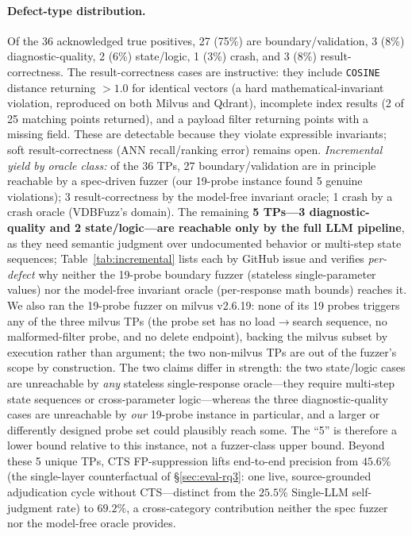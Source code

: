 \documentclass[sigconf]{acmart}
\begin{document}
\paragraph{Defect-type distribution.} Of the 36 acknowledged true positives, 27 (75\%) are boundary/validation, 3 (8\%) diagnostic-quality, 2 (6\%) state/logic, 1 (3\%) crash, and 3 (8\%) result-correctness. The result-correctness cases are instructive: they include \texttt{COSINE} distance returning $>1.0$ for identical vectors (a hard mathematical-invariant violation, reproduced on both Milvus and Qdrant), incomplete index results (2 of 25 matching points returned), and a payload filter returning points with a missing field. These are detectable because they violate expressible invariants; soft result-correctness (ANN recall/ranking error) remains open. \emph{Incremental yield by oracle class:} of the 36 TPs, 27 boundary/validation are in principle reachable by a spec-driven fuzzer (our 19-probe instance found 5 genuine violations); 3 result-correctness by the model-free invariant oracle; 1 crash by a crash oracle (VDBFuzz's domain). The remaining \textbf{5 TPs---3 diagnostic-quality and 2 state/logic---are reachable only by the full LLM pipeline}, as they need semantic judgment over undocumented behavior or multi-step state sequences; Table~\ref{tab:incremental} lists each by GitHub issue and verifies \emph{per-defect} why neither the 19-probe boundary fuzzer (stateless single-parameter values) nor the model-free invariant oracle (per-response math bounds) reaches it. We also ran the 19-probe fuzzer on milvus v2.6.19: none of its 19 probes triggers any of the three milvus TPs (the probe set has no load$\to$search sequence, no malformed-filter probe, and no delete endpoint), backing the milvus subset by execution rather than argument; the two non-milvus TPs are out of the fuzzer's scope by construction. The two claims differ in strength: the two state/logic cases are unreachable by \emph{any} stateless single-response oracle---they require multi-step state sequences or cross-parameter logic---whereas the three diagnostic-quality cases are unreachable by \emph{our} 19-probe instance in particular, and a larger or differently designed probe set could plausibly reach some. The ``5'' is therefore a lower bound relative to this instance, not a fuzzer-class upper bound. Beyond these 5 unique TPs, CTS FP-suppression lifts end-to-end precision from $45.6\%$ (the single-layer counterfactual of \S\ref{sec:eval-rq3}: one live, source-grounded adjudication cycle without CTS---distinct from the $25.5\%$ Single-LLM self-judgment rate) to $69.2\%$, a cross-category contribution neither the spec fuzzer nor the model-free oracle provides.
\end{document}

